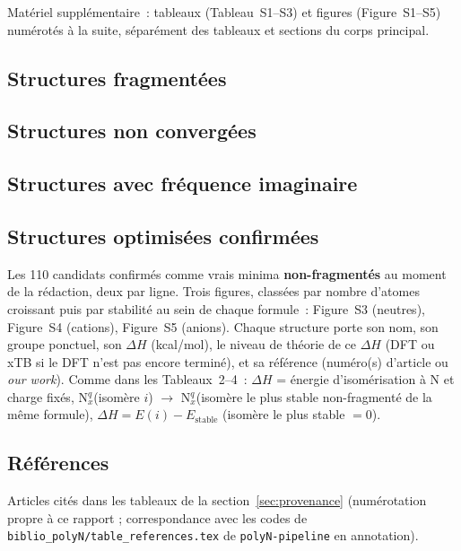 \documentclass[11pt,a4paper]{article}
\begin{document}
Mat\'eriel suppl\'ementaire~: tableaux (Tableau~S1--S3) et figures
(Figure~S1--S5) num\'erot\'es \`a la suite, s\'epar\'ement des tableaux et
sections du corps principal.

\subsection{Structures fragment\'ees}
\label{sec:si-fragmented}



\bigskip


\subsection{Structures non convergées}
\label{sec:si-nonconverged}



\bigskip


\subsection{Structures avec fr\'equence imaginaire}
\label{sec:si-imaginary}



\subsection{Structures optimis\'ees confirm\'ees}
\label{sec:si-confirmed}

Les 110 candidats confirm\'es comme vrais minima \textbf{non-fragment\'es}
au moment de la r\'edaction, deux par ligne. Trois figures, class\'ees
par nombre d'atomes croissant puis par stabilit\'e au sein de chaque
formule~: Figure~S3 (neutres), Figure~S4 (cations), Figure~S5 (anions).
Chaque structure porte son nom, son groupe ponctuel, son $\Delta H$
(kcal/mol), le niveau de th\'eorie de ce $\Delta H$ (DFT ou xTB si le DFT
n'est pas encore termin\'e), et sa r\'ef\'erence (num\'ero(s) d'article ou
\emph{our work}). Comme dans les Tableaux~2--4~: $\Delta H$ = \'energie
d'isom\'erisation \`a N et charge fix\'es, N$_x^{q}$(isom\`ere $i$)
$\rightarrow$ N$_x^{q}$(isom\`ere le plus stable non-fragment\'e de la
m\^eme formule), $\Delta H = E(i) - E_{\mathrm{stable}}$ (isom\`ere le
plus stable $=0$).



\clearpage
\subsection{R\'ef\'erences}
\label{sec:si-references}

Articles cit\'es dans les tableaux de la section~\ref{sec:provenance}
(num\'erotation propre \`a ce rapport ; correspondance avec les codes de
\texttt{biblio\_polyN/table\_references.tex} de \texttt{polyN-pipeline}
en annotation).


\end{document}

